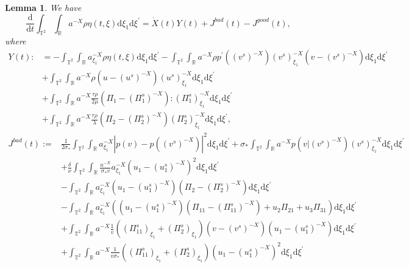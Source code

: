 \documentclass[10pt,reqno]{amsart}
\numberwithin{equation}{section}
\newtheorem{lemma}[theorem]{Lemma}
\newcommand{\dif}{\mathrm{d}}
\begin{document}
\begin{lemma}\label{le4.5}
We have
\begin{equation}\label{4.5}
\frac{\dif}{\dif t}\int_{\mathbb{T}^2}\int_{\mathbb{R}}a^{-X}\rho\eta(t,\xi)\dif \xi_1\dif \xi^{\prime}=\dot{X}(t)Y(t)+J^{bad}(t)-J^{good}(t),
\end{equation}
where
\begin{align*}
Y(t):&=-\int_{\mathbb{T}^2}\int_{\mathbb{R}}a^{-X}_{\xi_1}\rho\eta(t,\xi)\dif \xi_1\dif \xi^{\prime}
-\int_{\mathbb{T}^2}\int_{\mathbb{R}}a^{-X}\rho p^{\prime}((v^s)^{-X})(v^s)^{-X}_{\xi_1}(v-(v^s)^{-X})\dif \xi_1\dif \xi^{\prime}\\
&+\int_{\mathbb{T}^2}\int_{\mathbb{R}}a^{-X}\rho \left(u-(u^s)^{-X}\right)(u^s)^{-X}_{\xi_1}\dif \xi_1\dif \xi^{\prime}\\
 &+\int_{\mathbb{T}^2}\int_{\mathbb{R}}a^{-X} \frac{\tau\rho}{2\mu}\left(\Pi_1-(\Pi_1^s)^{-X}\right):(\Pi_1^s)^{-X}_{\xi_1}\dif \xi_1\dif \xi^{\prime}\\
&+\int_{\mathbb{T}^2}\int_{\mathbb{R}}a^{-X} \frac{\tau\rho}{\lambda}\left(\Pi_2-(\Pi_2^s)^{-X}\right)(\Pi_2^s)^{-X}_{\xi_1}\dif \xi_1\dif \xi^{\prime},
\end{align*}
\begin{align*}
J^{bad}(t):=&\frac{1}{2\sigma_\ast}\int_{\mathbb{T}^2}\int_{\mathbb{R}}a^{-X}_{\xi_1}
|p(v)-p((v^s)^{-X})|^2\dif \xi_1\dif \xi^{\prime}
+\sigma_\ast\int_{\mathbb{T}^2}\int_{\mathbb{R}}a^{-X}p(v|(v^s)^{-X})(v^s)^{-X}_{\xi_1}\dif \xi_1\dif \xi^{\prime}\\
&+\frac{\delta}{\nu}\int_{\mathbb{T}^2}\int_{\mathbb{R}}\frac{a^{-X}}{\sigma_\ast v}a^{-X}_{\xi_1}\left(u_1-(u_1^s)^{-X}\right)^2\dif \xi_1\dif \xi^{\prime}\\
&-\int_{\mathbb{T}^2}\int_{\mathbb{R}}a^{-X}_{\xi_1}\left(u_1-(u_1^s)^{-X}\right)\left(\Pi_2-(\Pi_2^s)^{-X}\right)\dif \xi_1\dif \xi^{\prime}\\
&-\int_{\mathbb{T}^2}\int_{\mathbb{R}}a^{-X}_{\xi_1}\left(\left(u_1-(u^s_1)^{-X}\right)
\left(\Pi_{11}-(\Pi_{11}^s)^{-X}\right)+u_2\Pi_{21}+u_3\Pi_{31}
\right)\dif \xi_1\dif \xi^{\prime}\\
&+\int_{\mathbb{T}^2}\int_{\mathbb{R}}
a^{-X}\frac{1}{v}\left((\Pi_{11}^s)_{\xi_1}+(\Pi_{2}^s)_{\xi_1}\right)(v-(v^s)^{-X})\left(u_1-(u_1^s)^{-X}\right)
\dif \xi_1\dif \xi^{\prime}\\
&+\int_{\mathbb{T}^2}\int_{\mathbb{R}}a^{-X}\frac{1}{v\sigma_\ast}
\left((\Pi_{11}^s)_{\xi_1}+(\Pi_{2}^s)_{\xi_1}\right)\left(u_1-(u_1^s)^{-X}\right)^2
\dif \xi_1\dif \xi^{\prime}
\\

\end{align*}
\end{lemma}
\end{document}
